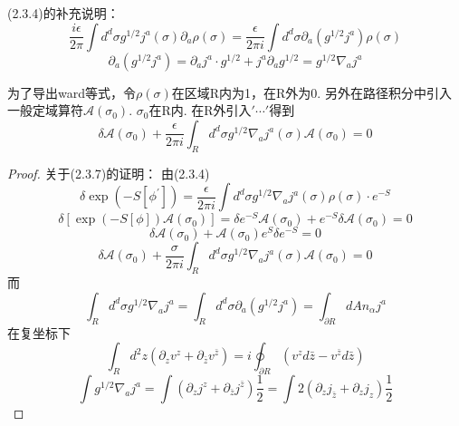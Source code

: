 \begin{remark}
(2.3.4)的补充说明：
$$
\frac{i \epsilon}{2 \pi} \int d ^d \sigma g^{1 / 2} j^{a}(\sigma) \partial_{a} \rho(\sigma) 
=\frac{\epsilon}{2 \pi i} \int d^{d} \sigma \partial_{a}\left(g^{1 / 2}j^{a}\right)\rho(\sigma)
$$
$$
\partial_{a}\left(g^{1 / 2} j^{a}\right)=\partial_{a} j^{a} \cdot g^{1 / 2}+j^{a} \partial_{a} g^{1 / 2}
=g^{1 / 2}\nabla_{a}j^{a}
$$
\end{remark}
为了导出ward等式，令$\rho(\sigma)$在区域R内为1，在R外为0. 另外在路径积分中引入一般定域算符$\mathscr{A}\left(\sigma_{0}\right)$. $\sigma_0$在R内. 在R外引入$'\cdots'$得到
\begin{equation}
\delta \mathscr{A}\left(\sigma_{0}\right)+\frac{\epsilon}{2 \pi i} \int_{R} d^{d} \sigma g^{1 / 2} \nabla_{a} j^{a}(\sigma) \mathscr{A}\left(\sigma_{0}\right)=0
\end{equation}

\begin{proof}
关于(2.3.7)的证明：
由(2.3.4)
$$
\delta \exp \left(-S\left[\phi^{\prime}\right]\right)=\frac{ \epsilon}{2 \pi i} \int d^{d} \sigma g^{1 / 2} \nabla_{a} j^{a}(\sigma) \rho(\sigma) \cdot e^{-S}
$$
$$
\delta\left[\exp (-S[\phi]) \mathscr{A}\left(\sigma_{0}\right)\right]=\delta e^{-S} \mathscr{A}\left(\sigma_{0}\right)+e^{-S} \delta\mathscr{A}(\sigma_0)=0
$$
$$
\delta \mathscr{A}\left(\sigma_{0}\right) +\mathscr{A}\left(\sigma_{0}\right) e^{S} \delta e^{-S}=0
$$
$$
\delta \mathscr{A}\left(\sigma_{0}\right)+\frac{\sigma}{2 \pi i} \int_{R} d^{d} \sigma g^{1 / 2} \nabla_{a} j^{a}(\sigma) \mathscr{A}\left(\sigma_{0}\right)=0
$$
而
$$
\int_{R} d^{d} \sigma g^{1 / 2} \nabla_{a} j^{a} =\int_{R} d^{d} \sigma \partial_{a}\left(g^{1 / 2} j^{a}\right) 
=\int_{\partial R} d A n_{\alpha} j^{a}
$$
在复坐标下
$$
\int_{R} d^{2} z\left(\partial_{z} v^{z}+\partial_{\bar{z}} v^{\bar{z}}\right)=i \oint_{\partial R}(v^{z} d \bar{z}-v^{\bar{z}} d \bar{z})
$$
$$
\int g^{1 / 2} \nabla_{a} j^{a}=\int\left(\partial_{z} j^{z}+\partial_{\bar{z}} j^{\bar{z}}\right)\frac{1}{2}=\int 2\left(\partial_{z} j_{\bar{z}}+\partial_{z} j_{z}\right) \frac{1}{2}
$$
\end{proof}

